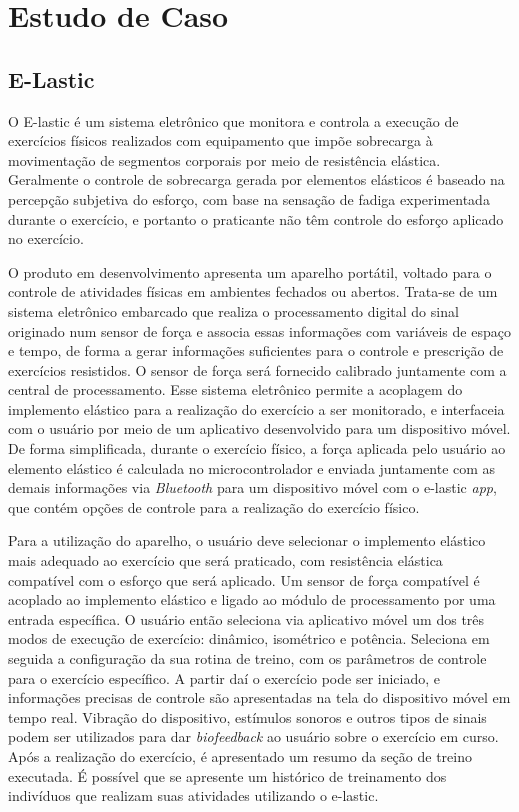 \chapter{Estudo de Caso}
\label{ap:elastic}

\section{E-Lastic}
O E-lastic é um sistema eletrônico que monitora e controla a execução de exercícios físicos realizados com equipamento que impõe sobrecarga à movimentação de segmentos corporais por meio de resistência elástica. Geralmente o controle de sobrecarga gerada por elementos elásticos é baseado na percepção subjetiva do esforço, com base na sensação de fadiga experimentada durante o exercício, e portanto o praticante não têm controle do esforço aplicado no exercício.

O produto em desenvolvimento apresenta um aparelho portátil, voltado para o controle de atividades físicas em ambientes fechados ou abertos. Trata-se de um sistema eletrônico embarcado que realiza o processamento digital do sinal originado num sensor de força e associa essas informações com variáveis de espaço e tempo, de forma a gerar informações suficientes para o controle e prescrição de exercícios resistidos. O sensor de força será fornecido calibrado juntamente com a central de processamento. Esse sistema eletrônico permite a acoplagem do implemento elástico para a realização do exercício a ser monitorado, e interfaceia com o usuário por meio de um aplicativo desenvolvido para um dispositivo móvel. De forma simplificada, durante o exercício físico, a força aplicada pelo usuário ao elemento elástico é calculada no microcontrolador e enviada juntamente com as demais informações via \textit{Bluetooth} para um dispositivo móvel com o e-lastic \textit{app}, que contém opções de controle para a realização do exercício físico.

Para a utilização do aparelho, o usuário deve selecionar o implemento elástico mais adequado ao exercício que será praticado, com resistência elástica compatível com o esforço que será aplicado. Um sensor de força compatível é acoplado ao implemento elástico e ligado ao módulo de processamento por uma entrada específica. O usuário então seleciona via aplicativo móvel um dos três modos de execução de exercício: dinâmico, isométrico e potência. Seleciona em seguida a configuração da sua rotina de treino, com os parâmetros de controle para o exercício específico. A partir daí o exercício pode ser iniciado, e informações precisas de controle são apresentadas na tela do dispositivo móvel em tempo real. Vibração do dispositivo, estímulos sonoros e outros tipos de sinais podem ser utilizados para dar \textit{biofeedback} ao usuário sobre o exercício em curso. Após a realização do exercício, é apresentado um resumo da seção de treino executada. É possível que se apresente um histórico de treinamento dos indivíduos que realizam suas atividades utilizando o e-lastic.

